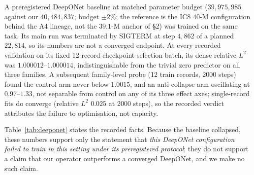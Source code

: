 \documentclass[11pt,a4paper]{article}
\begin{document}
A preregistered DeepONet baseline at matched parameter budget ($39{,}975{,}985$ against
our $40{,}484{,}837$; budget $\pm2\%$; the reference is the IC8 40-M configuration behind
the A4 lineage, not the $39.1$-M anchor of \S2) was trained on the same task. Its main run was
terminated by SIGTERM at step $4{,}862$ of a planned $22{,}814$, so its numbers are not a
converged endpoint. At every recorded validation on its fixed 12-record checkpoint-selection
batch, its dense relative $L^2$ was $1.000012$--$1.000014$, indistinguishable from the
trivial zero predictor on all three families. A subsequent family-level probe (12 train
records, 2000 steps) found the control arm never below $1.0015$, and an anti-collapse arm
oscillating at $0.97$--$1.33$, not separable from control on any of its three effect axes;
single-record fits do converge (relative $L^2$ $0.025$ at 2000 steps), so the recorded
verdict attributes the failure to optimisation, not capacity.

\begin{table}[t]
\centering
\caption{DeepONet baseline at matched parameter budget. No same-caliber comparison exists:
the DeepONet run stopped early and was never evaluated on the 480-record census, so the
rows pair the nearest available calibers and each row names its own. The comparison
establishes that this baseline failed to train in this setting; it is not an accuracy
ranking between converged models.}
\label{tab:deeponet}
\end{table}

Table~\ref{tab:deeponet} states the recorded facts. Because the baseline collapsed, these
numbers support only the statement that \emph{this DeepONet configuration failed to train
in this setting under its preregistered protocol}; they do not support a claim that our
operator outperforms a converged DeepONet, and we make no such claim.
\end{document}
